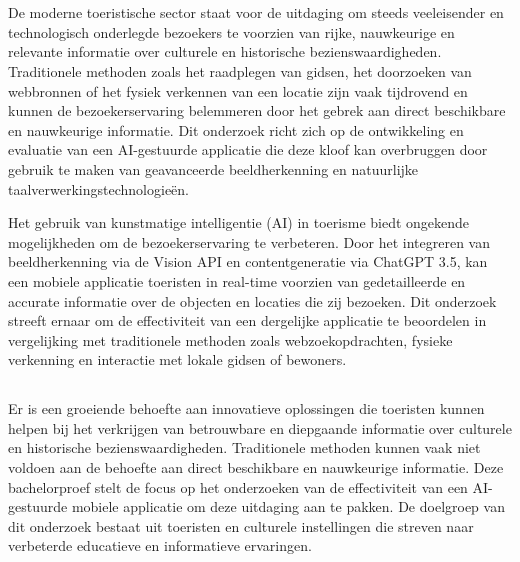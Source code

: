
\chapter{}%
\label{ch:inleiding}

De moderne toeristische sector staat voor de uitdaging om steeds veeleisender en technologisch onderlegde bezoekers te voorzien van rijke, nauwkeurige en relevante informatie over culturele en historische bezienswaardigheden. Traditionele methoden zoals het raadplegen van gidsen, het doorzoeken van webbronnen of het fysiek verkennen van een locatie zijn vaak tijdrovend en kunnen de bezoekerservaring belemmeren door het gebrek aan direct beschikbare en nauwkeurige informatie. Dit onderzoek richt zich op de ontwikkeling en evaluatie van een AI-gestuurde applicatie die deze kloof kan overbruggen door gebruik te maken van geavanceerde beeldherkenning en natuurlijke taalverwerkingstechnologieën.

Het gebruik van kunstmatige intelligentie (AI) in toerisme biedt ongekende mogelijkheden om de bezoekerservaring te verbeteren. Door het integreren van beeldherkenning via de Vision API en contentgeneratie via ChatGPT 3.5, kan een mobiele applicatie toeristen in real-time voorzien van gedetailleerde en accurate informatie over de objecten en locaties die zij bezoeken. Dit onderzoek streeft ernaar om de effectiviteit van een dergelijke applicatie te beoordelen in vergelijking met traditionele methoden zoals webzoekopdrachten, fysieke verkenning en interactie met lokale gidsen of bewoners.

\section{}%
\label{sec:probleemstelling}

Er is een groeiende behoefte aan innovatieve oplossingen die toeristen kunnen helpen bij het verkrijgen van betrouwbare en diepgaande informatie over culturele en historische bezienswaardigheden. Traditionele methoden kunnen vaak niet voldoen aan de behoefte aan direct beschikbare en nauwkeurige informatie. Deze bachelorproef stelt de focus op het onderzoeken van de effectiviteit van een AI-gestuurde mobiele applicatie om deze uitdaging aan te pakken. De doelgroep van dit onderzoek bestaat uit toeristen en culturele instellingen die streven naar verbeterde educatieve en informatieve ervaringen.

